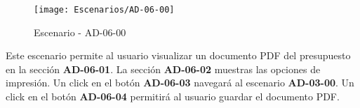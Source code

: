 \begin{figure}[H]
\centering
\texttt{[image: Escenarios/AD-06-00]}
\caption{Escenario - AD-06-00}
\label{fig:AD-06-00}
\end{figure}
Este escenario permite al usuario visualizar un documento PDF del presupuesto en la sección \textbf{AD-06-01}. La sección \textbf{AD-06-02} muestras las opciones de impresión. Un click en el botón \textbf{AD-06-03} navegará al escenario \textbf{AD-03-00}. Un click en el botón \textbf{AD-06-04} permitirá al usuario guardar el documento PDF.
\\